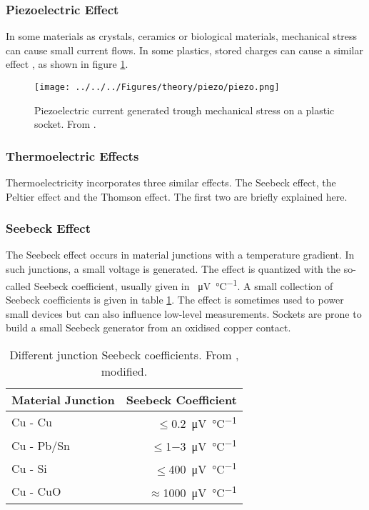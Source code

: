 \subsubsection{Piezoelectric Effect}
\label{sec:theory:piezo}
In some materials as crystals, ceramics or biological materials, mechanical stress can cause small current flows. In some plastics, stored charges can cause a similar effect \cite{lowlvl}, as shown in figure \ref{fig:theory:piezo}.
\begin{figure}
	\centering
	\texttt{[image: ../../../Figures/theory/piezo/piezo.png]}
	\caption{Piezoelectric current generated trough mechanical stress on a plastic socket. From \cite{lowlvl}.}
	\label{fig:theory:piezo}
\end{figure}
\subsubsection{Thermoelectric Effects}
Thermoelectricity incorporates three similar effects. The Seebeck effect, the Peltier effect and the Thomson effect. The first two are briefly explained here.
\subsubsection*{Seebeck Effect}
The Seebeck effect occurs in material junctions with a temperature gradient. In such junctions, a small voltage is generated. The effect is quantized with the so-called Seebeck coefficient, usually given in \SI[per-mode=symbol]{}{\micro\volt\per\degreeCelsius}.
A small collection of Seebeck coefficients is given in table \ref{tab:theory:seebeck}. The effect is sometimes used to power small devices but can also influence low-level measurements. Sockets are prone to build a small Seebeck generator from an oxidised copper contact.
\begin{table}
	\centering
	\begin{tabular}{lr}
		\hline
		Material Junction & Seebeck Coefficient \\ \hline
		Cu - Cu & $\leq$\SI[per-mode=symbol]{0.2}{\micro\volt\per\degreeCelsius} \\
		Cu - Pb/Sn & $\leq$\SI{1}{}$-$\SI[per-mode=symbol]{3}{\micro\volt\per\degreeCelsius} \\
		Cu - Si & $\leq$\SI[per-mode=symbol]{400}{\micro\volt\per\degreeCelsius} \\
		Cu - CuO & $\approx$\SI[per-mode=symbol]{1000}{\micro\volt\per\degreeCelsius} \\ \hline
	\end{tabular}
	\caption{Different junction Seebeck coefficients. From \cite{lowlvl}, modified.}
	\label{tab:theory:seebeck}
\end{table}
